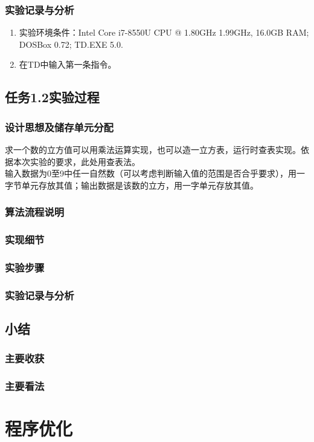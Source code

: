 \documentclass{ctexrep}
\begin{document}
\subsection{实验记录与分析}
\begin{enumerate}
    \item 实验环境条件：Intel Core i7-8550U CPU @ 1.80GHz 1.99GHz, 16.0GB RAM; DOSBox 0.72; TD.EXE 5.0.
    \item 在TD中输入第一条指令。
\end{enumerate}
\section{任务1.2实验过程}
\subsection{设计思想及储存单元分配}
求一个数的立方值可以用乘法运算实现，也可以造一立方表，运行时查表实现。依据本次实验的要求，此处用查表法。\\
\indent 输入数据为0至9中任一自然数（可以考虑判断输入值的范围是否合乎要求），用一字节单元存放其值；输出数据是该数的立方，用一字单元存放其值。
\subsection{算法流程说明}
\subsection{实现细节}
\subsection{实验步骤}
\subsection{实验记录与分析}
\section{小结}
\subsection{主要收获}
\subsection{主要看法}

\chapter{程序优化}
\end{document}
